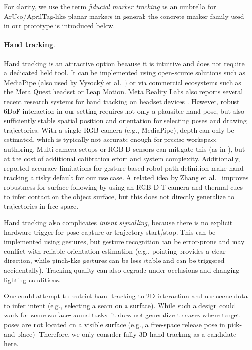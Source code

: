 For clarity, we use the term \emph{fiducial marker tracking} as an umbrella for ArUco/AprilTag-like planar markers in general; the concrete marker family used in our prototype is introduced below.

\paragraph{Hand tracking.}
Hand tracking is an attractive option because it is intuitive and does not require a dedicated held tool. It can be implemented using open-source solutions such as MediaPipe \cite{MediaPipeRoot} (also used by Vysocký et al.\ \cite{Vysocky2023}) or via commercial ecosystems such as the Meta Quest headset or Leap Motion. Meta Reality Labs also reports several recent research systems for hand tracking on headset devices \cite{FB_research, FB__UmeTrack, FB__MEgATrack, FB__ElasticHandTrack}.
However, robust 6DoF interaction in our setting requires not only a plausible hand pose, but also sufficiently stable spatial position and orientation for selecting poses and drawing trajectories. With a single RGB camera (e.g., MediaPipe), depth can only be estimated, which is typically not accurate enough for precise workspace authoring. Multi-camera setups or RGB-D sensors can mitigate this (as in \cite{Vysocky2023}), but at the cost of additional calibration effort and system complexity. Additionally, reported accuracy limitations for gesture-based robot path definition \cite{Vysocky2023} make hand tracking a risky default for our use case.
A related idea by Zhang et al.\ \cite{Zhang2023} improves robustness for surface-following by using an RGB-D-T camera and thermal cues to infer contact on the object surface, but this does not directly generalize to trajectories in free space.

Hand tracking also complicates \emph{intent signalling}, because there is no explicit hardware trigger for pose capture or trajectory start/stop. This can be implemented using gestures, but gesture recognition can be error-prone and may conflict with reliable orientation estimation (e.g., pointing provides a clear direction, while pinch-like gestures can be less stable and can be triggered accidentally). Tracking quality can also degrade under occlusions and changing lighting conditions.

One could attempt to restrict hand tracking to 2D interaction and use scene data to infer intent (e.g., selecting a seam on a surface). While such a design could work for some surface-bound tasks, it does not generalize to cases where target poses are not located on a visible surface (e.g., a free-space release pose in pick-and-place). Therefore, we only consider fully 3D hand tracking as a candidate here.


